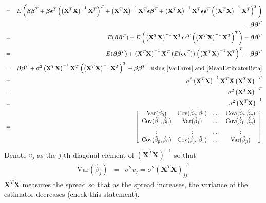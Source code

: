 \documentclass[11pt]{article}
\theoremstyle{remark}
\begin{document}
\begin{eqnarray}
&=& E\left(\boldsymbol{\beta}\boldsymbol{\beta}^T  + \boldsymbol{\beta} \boldsymbol{\epsilon}^T\left(\left(\mathbf{X}^T\mathbf{X}\right)^{-1}\mathbf{X}^T\right)^T + \left(\mathbf{X}^T\mathbf{X}\right)^{-1}\mathbf{X}^T\boldsymbol{\epsilon}\boldsymbol{\beta}^T + \left(\mathbf{X}^T\mathbf{X}\right)^{-1}\mathbf{X}^T\boldsymbol{\epsilon}\boldsymbol{\epsilon}^T\left(\left(\mathbf{X}^T\mathbf{X}\right)^{-1}\mathbf{X}^T\right)^T\right) \nonumber\\
&& - \boldsymbol{\beta}\boldsymbol{\beta}^T\nonumber\\
&=& E(\boldsymbol{\beta}\boldsymbol{\beta}^T) + E\left(\left(\mathbf{X}^T\mathbf{X}\right)^{-1}\mathbf{X}^T\boldsymbol{\epsilon}\boldsymbol{\epsilon}^T\left(\left(\mathbf{X}^T\mathbf{X}\right)^{-1}\mathbf{X}^T\right)^T\right) - \boldsymbol{\beta}\boldsymbol{\beta}^T\nonumber\\
&=& E(\boldsymbol{\beta}\boldsymbol{\beta}^T) + \left(\mathbf{X}^T\mathbf{X}\right)^{-1}\mathbf{X}^T\left(E(\boldsymbol{\epsilon}\boldsymbol{\epsilon}^T)\right)\left(\left(\mathbf{X}^T\mathbf{X}\right)^{-1}\mathbf{X}^T\right)^T - \boldsymbol{\beta}\boldsymbol{\beta}^T\nonumber\\
&=& \boldsymbol{\beta}\boldsymbol{\beta}^T + \sigma^2 \left(\mathbf{X}^T\mathbf{X}\right)^{-1}\mathbf{X}^T\left(\left(\mathbf{X}^T\mathbf{X}\right)^{-1}\mathbf{X}^T\right)^T - \boldsymbol{\beta}\boldsymbol{\beta}^T\:\:\:\:\text{using \eqref{VarError} and \eqref{MeanEstimatorBeta}}\nonumber\\
&=& \sigma^2 \left(\mathbf{X}^T\mathbf{X}\right)^{-1}\mathbf{X}^T\mathbf{X}\left(\mathbf{X}^T\mathbf{X}\right)^{-T}\nonumber\\
&=& \sigma^2 \left(\mathbf{X}^T\mathbf{X}\right)^{-T}\nonumber\\
&=& \sigma^2 \left(\mathbf{X}^T\mathbf{X}\right)^{-1}\label{VarEstimator}\\
&=&
\left[
\begin{array}{cccc}
\text{Var}(\hat{\beta}_0) & \text{Cov}(\hat{\beta}_0,\hat{\beta}_1) & \hdots & \text{Cov}(\hat{\beta}_0,\hat{\beta}_{p})\\
\text{Cov}(\hat{\beta}_1,\hat{\beta}_0) & \text{Var}(\hat{\beta}_1) & \hdots & \text{Cov}(\hat{\beta}_1,\hat{\beta}_{p})\\
\vdots & \vdots & \hdots & \vdots \\
\text{Cov}(\hat{\beta}_p,\hat{\beta}_0) &  \text{Cov}(\hat{\beta}_p,\hat{\beta}_1)& \hdots & \text{Var}(\hat{\beta}_p)
\end{array}
\right]
\label{VarEstimatorMatrixForm}
\end{eqnarray}
Denote $v_j$ as the $j$-th diagonal element of $\left(\mathbf{X}^T\mathbf{X}\right)^{-1}$ so that
\begin{eqnarray}
\text{Var}(\hat{\beta}_j) &=& \sigma^2 v_j = \sigma^2 \left(\mathbf{X}^T\mathbf{X}\right)^{-1}_{jj}\label{VarianceEstimatorDiag}
\end{eqnarray}
$\mathbf{X}^T\mathbf{X}$ measures the spread so that as the spread increases, the variance of the estimator decreases (check this statement).
\end{document}
